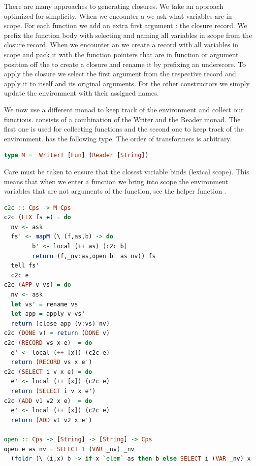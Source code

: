 {There are many approaches to generating closures. We take an approach optimized for simplicity. When we encounter a  we ask what variables are in scope. For each function we add an extra first argument : the closure record. We prefix the function body with selecting and naming all variables in scope from the closure record. When we encounter an  we create a record with all variables in scope and pack it with the function pointers that are in function or argument position off the  to create a closure and rename it by prefixing an underscore. To apply the closure we select the first argument from the respective record and apply it to itself and its original arguments. For the other constructors we simply update the environment with their assigned names.

We now use a different monad  to keep track of the environment and collect our functions.  consists of a combination of the Writer and the Reader monad. The first one is used for collecting functions and the second one to keep track of the environment.  has the following type. The order of transformers is arbitrary.

\begin{lstlisting}[language=Haskell]
type M =  WriterT [Fun] (Reader [String])
\end{lstlisting}

Care must be taken to ensure that the closest variable binds (lexical scope). This means that when we enter a function we bring into scope the environment variables that are not arguments of the function, see the helper function .

\begin{lstlisting}[language=Haskell]
c2c :: Cps -> M Cps
c2c (FIX fs e) = do
  nv <- ask
  fs' <- mapM (\ (f,as,b) -> do
        b' <- local (++ as) (c2c b)
        return (f,_nv:as,open b' as nv)) fs
  tell fs'
  c2c e
c2c (APP v vs) = do
  nv <- ask
  let vs' = rename vs
  let app = apply v vs'
  return (close app (v:vs) nv)
c2c (DONE v) = return (DONE v)
c2c (RECORD vs x e)  = do
  e' <- local (++ [x]) (c2c e)
  return (RECORD vs x e')
c2c (SELECT i v x e) = do
  e' <- local (++ [x]) (c2c e)
  return (SELECT i v x e')
c2c (ADD v1 v2 x e)  = do
  e' <- local (++ [x]) (c2c e)
  return (ADD v1 v2 x e')

open :: Cps -> [String] -> [String] -> Cps
open e as nv = SELECT 1 (VAR _nv) _nv
  (foldr (\ (i,x) b -> if x `elem` as then b else SELECT i (VAR _nv) x b) e (zip [0..] nv))


\end{lstlisting}}
